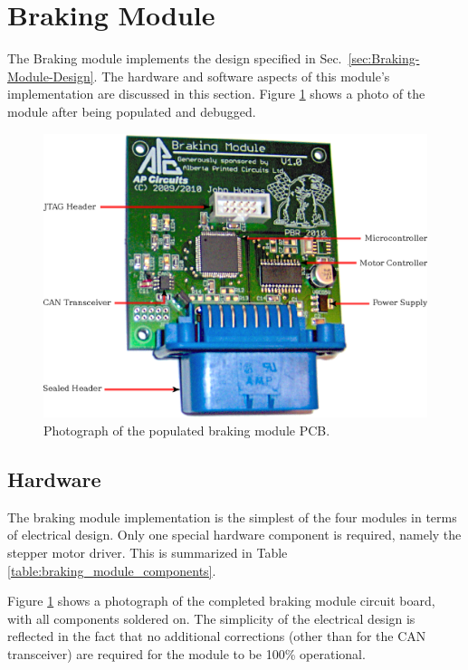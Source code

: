 \section{Braking Module}

The Braking module implements the design specified in Sec.\ \ref{sec:Braking-Module-Design}. The hardware and software aspects of this module's implementation are discussed in this section. Figure \ref{fig:braking_pcb} shows a photo of the module after being populated and debugged.

\begin{figure}[H]
\centering
\includegraphics[scale=1]{implementation/figures/braking_pcb}
\caption{Photograph of the populated braking module PCB.}
\label{fig:braking_pcb}
\end{figure}

\subsection{Hardware}

The braking module implementation is the simplest of the four modules in terms of electrical design. Only one special hardware component is required, namely the stepper motor driver. This is summarized in Table \ref{table:braking_module_components}.

Figure \ref{fig:braking_pcb} shows a photograph of the completed braking module circuit board, with all components soldered on. The simplicity of the electrical design is reflected in the fact that no additional corrections (other than for the CAN transceiver) are required for the module to be 100\% operational.

